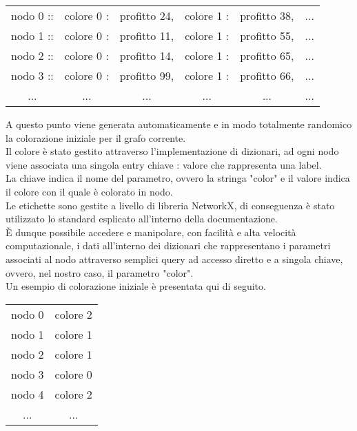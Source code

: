 \begin{table}[H]
\centering
\begin{tabular}{llllll}
\multicolumn{1}{c}{nodo 0 ::} & \multicolumn{1}{c}{colore 0 :} & \multicolumn{1}{c}{profitto 24,} & \multicolumn{1}{c}{colore 1 :} & \multicolumn{1}{c}{profitto 38,} & \multicolumn{1}{c}{...} \\
nodo 1 :: & colore 0 : & profitto 11, & colore 1 : & profitto 55, & ... \\
nodo 2 :: & colore 0 : & profitto 14, & colore 1 : & profitto 65, & ... \\
nodo 3 :: & colore 0 : & profitto 99, & colore 1 : & profitto 66, & ... \\
\multicolumn{1}{c}{...} & \multicolumn{1}{c}{...} & \multicolumn{1}{c}{...} & \multicolumn{1}{c}{...} & \multicolumn{1}{c}{...} & \multicolumn{1}{c}{...}
\end{tabular}
\end{table}

A questo punto viene generata automaticamente e in modo totalmente randomico la colorazione iniziale per il grafo corrente.\\
Il colore è stato gestito attraverso l'implementazione di dizionari, ad ogni nodo viene associata una singola entry chiave : valore che rappresenta una label.\\ La chiave indica il nome del parametro, ovvero la stringa "color" e il valore indica il colore con il quale è colorato in nodo.\\
Le etichette sono gestite a livello di libreria NetworkX, di conseguenza è stato utilizzato lo standard esplicato all'interno della documentazione.\\
È dunque possibile accedere e manipolare, con facilità e alta velocità computazionale, i dati all'interno dei dizionari che rappresentano i parametri associati al nodo attraverso semplici query ad accesso diretto e a singola chiave, ovvero, nel nostro caso, il parametro "color".\\
Un esempio di colorazione iniziale è presentata qui di seguito.

\begin{table}[H]
\centering
\begin{tabular}{cc}
nodo 0 & colore 2 \\
nodo 1 & colore 1 \\
nodo 2 & colore 1 \\
nodo 3 & colore 0 \\
nodo 4 & colore 2 \\
... & ...
\end{tabular}
\end{table}

